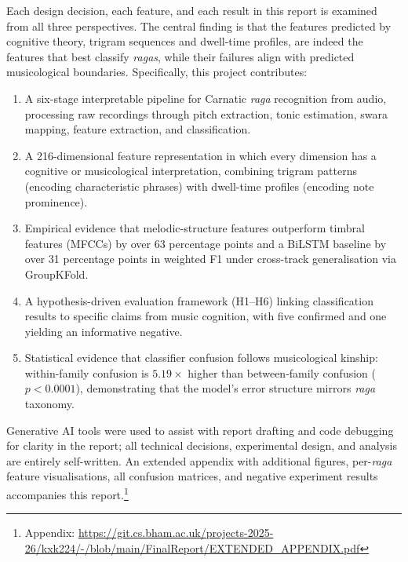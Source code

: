 \documentclass[11pt,a4paper]{article}
\begin{document}
{Each design decision, each feature, and each result in this report is examined from all three perspectives. The central finding is that the features predicted by cognitive theory, trigram sequences and dwell-time profiles, are indeed the features that best classify \textit{ragas}, while their failures align with predicted musicological boundaries. Specifically, this project contributes:

\begin{enumerate}
  \item A six-stage interpretable pipeline for Carnatic \textit{raga} recognition from audio, processing raw recordings through pitch extraction, tonic estimation, swara mapping, feature extraction, and classification.
  \item A 216-dimensional feature representation in which every dimension has a cognitive or musicological interpretation, combining trigram patterns (encoding characteristic phrases) with dwell-time profiles (encoding note prominence).
  \item Empirical evidence that melodic-structure features outperform timbral features (MFCCs) by over 63 percentage points and a BiLSTM baseline by over 31 percentage points in weighted F1 under cross-track generalisation via GroupKFold.
  \item A hypothesis-driven evaluation framework (H1--H6) linking classification results to specific claims from music cognition, with five confirmed and one yielding an informative negative.
  \item Statistical evidence that classifier confusion follows musicological kinship: within-family confusion is $5.19\times$ higher than between-family confusion ($p < 0.0001$), demonstrating that the model's error structure mirrors \textit{raga} taxonomy.
\end{enumerate}

\noindent Generative AI tools were used to assist with report drafting and code debugging for clarity in the report; all technical decisions, experimental design, and analysis are entirely self-written. An extended appendix with additional figures, per-\textit{raga} feature visualisations, all confusion matrices, and negative experiment results accompanies this report.\footnote{Appendix: \href{https://git.cs.bham.ac.uk/projects-2025-26/kxk224/-/blob/main/FinalReport/EXTENDED_APPENDIX.pdf}{https://git.cs.bham.ac.uk/projects-2025-26/kxk224/-/blob/main/FinalReport/EXTENDED\_APPENDIX.pdf}}

}
\end{document}
